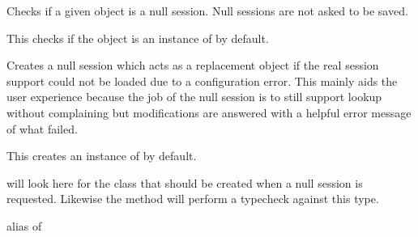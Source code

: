 \documentclass[a4paper,12pt]{sphinxmanual}
\begin{document}
\begin{fulllineitems}
\begin{fulllineitems}
\end{fulllineitems}


\begin{fulllineitems}
\label{api:flask.sessions.SessionInterface.is_null_session}
Checks if a given object is a null session.  Null sessions are
not asked to be saved.

This checks if the object is an instance of {\hyperref[api:flask.sessions.SessionInterface.null_session_class]{}}
by default.

\end{fulllineitems}


\begin{fulllineitems}
\label{api:flask.sessions.SessionInterface.make_null_session}
Creates a null session which acts as a replacement object if the
real session support could not be loaded due to a configuration
error.  This mainly aids the user experience because the job of the
null session is to still support lookup without complaining but
modifications are answered with a helpful error message of what
failed.

This creates an instance of {\hyperref[api:flask.sessions.SessionInterface.null_session_class]{}} by default.

\end{fulllineitems}


\begin{fulllineitems}
\label{api:flask.sessions.SessionInterface.null_session_class}
{\hyperref[api:flask.sessions.SessionInterface.make_null_session]{}} will look here for the class that should
be created when a null session is requested.  Likewise the
{\hyperref[api:flask.sessions.SessionInterface.is_null_session]{}} method will perform a typecheck against
this type.

alias of {\hyperref[api:flask.sessions.NullSession]{}}

\end{fulllineitems}


\end{fulllineitems}
\end{document}
